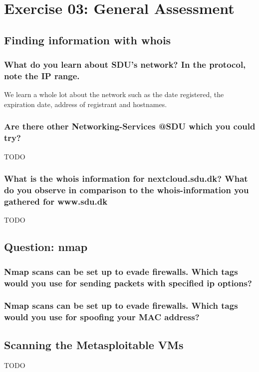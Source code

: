 \section*{Exercise 03: General Assessment}

\subsection*{Finding information with whois}

\subsubsection*{What do you learn about SDU's network? In the protocol, note the IP range.}
We learn a whole lot about the network such as the date registered, the expiration date, address of registrant and hostnames.

\subsubsection*{Are there other Networking-Services @SDU which you could try?}
TODO

\subsubsection*{What is the whois information for nextcloud.sdu.dk? What do you observe in comparison to the whois-information you gathered for www.sdu.dk}
TODO

\subsection*{Question: nmap}
\subsubsection*{Nmap scans can be set up to evade firewalls. Which tags would you use for sending packets with specified ip options?}
\subsubsection*{Nmap scans can be set up to evade firewalls. Which tags would you use for spoofing your MAC address?}

\subsection*{Scanning the Metasploitable VMs}
TODO

